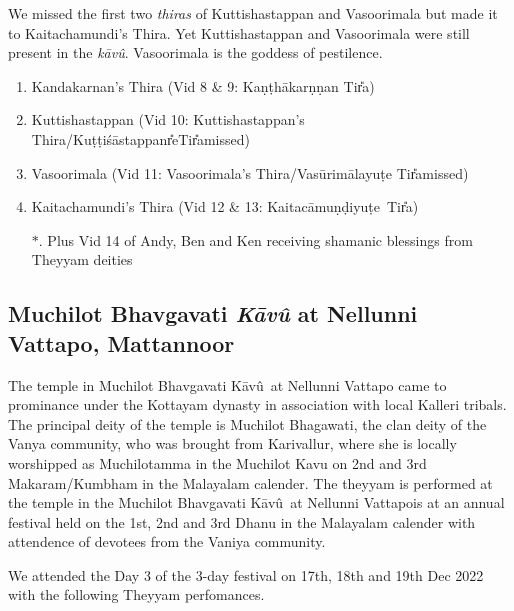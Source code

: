 \documentclass[a4paper, 11pt]{article} %
\newcommand{\kavu}[0]{\textit{k\={a}v\^{u}}}
\newcommand{\Kavu}[0]{K\={a}v\^{u}}
\newcommand{\kuttisastappanre}[0]{Ku\d{t}\d{t}i\'{s}\={a}stappan\U{r}e}
\newcommand{\tira}[0]{Ti\U{r}a}
\newcommand{\kaitacamundiyute}[0]{Kaitac\={a}mu\d{n}\d{d}iyu\d{t}e}
\begin{document}
We missed the first two \textit{thiras} of Kuttishastappan and Vasoorimala but made it to Kaitachamundi's Thira. 
Yet Kuttishastappan and Vasoorimala were still present in the \kavu. 
Vasoorimala is the goddess of pestilence.

\begin{enumerate}
\item Kandakarnan's Thira (Vid 8 \& 9: Ka\d{n}\d{t}h\={a}kar\d{n}\d{n}an Ti\U{r}a) 
\item Kuttishastappan (Vid 10: Kuttishastappan's Thira/\kuttisastappanre \tira missed) 
\item Vasoorimala (Vid 11: Vasoorimala's Thira/Vas\={u}rim\={a}layu\d{t}e \tira missed) 
\item Kaitachamundi's Thira (Vid 12 \& 13: \kaitacamundiyute\ \tira)
\item[$*$.] Plus Vid 14 of Andy, Ben and Ken receiving shamanic blessings from Theyyam deities 
\end{enumerate}


\subsection{Muchilot Bhavgavati \textit{K\={a}v\^{u}} at Nellunni Vattapo, Mattannoor}%
  \label{sub:Muchilot Bhavgavati Kavu at Nellunni Vattapo, Mattannoor}

The temple in Muchilot Bhavgavati \Kavu\ at Nellunni Vattapo came to prominance under the Kottayam dynasty in association with local Kalleri tribals. 
The principal deity of the temple is Muchilot Bhagawati, the clan deity of the Vanya community, who was brought from Karivallur, where she is locally worshipped as Muchilotamma in the Muchilot Kavu on 2nd and 3rd Makaram/Kumbham in the Malayalam calender. 
The theyyam is performed at the temple in the Muchilot Bhavgavati \Kavu\ at Nellunni Vattapois at an annual festival held on the 1st, 2nd and 3rd Dhanu in the Malayalam calender with attendence of devotees from the Vaniya community.

We attended the Day 3 of the 3-day festival on 17th, 18th and 19th Dec 2022 with the following Theyyam perfomances.
\end{document}
